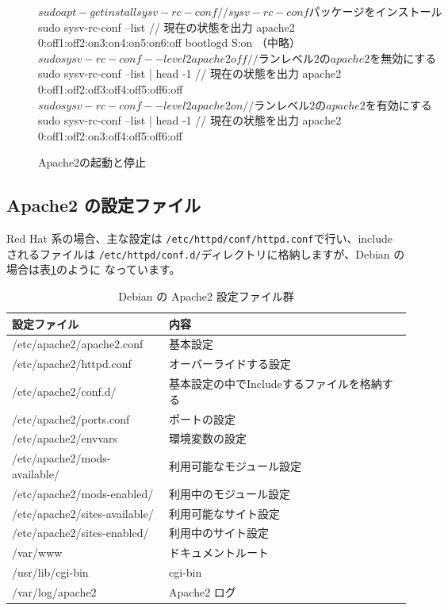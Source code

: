 \documentclass[mingoth,a4paper]{jsarticle}
\begin{document}
\begin{figure}[ht]

\begin{commandline}
$ sudo apt-get install sysv-rc-conf // sysv-rc-conf パッケージをインストール
$ sudo sysv-rc-conf --list // 現在の状態を出力
apache2      0:off1:off2:on3:on4:on5:on6:off
bootlogd     S:on
（中略）
$ sudo sysv-rc-conf --level 2 apache2 off // ランレベル2のapache2を無効にする
$ sudo sysv-rc-conf --list | head -1 // 現在の状態を出力
apache2      0:off1:off2:off3:off4:off5:off6:off
$ sudo sysv-rc-conf --level 2 apache2 on // ランレベル2のapache2を有効にする
$ sudo sysv-rc-conf --list | head -1  // 現在の状態を出力
apache2      0:off1:off2:on3:off4:off5:off6:off
\end{commandline}
\label{fig:sysv-rc}\caption{Apache2の起動と停止}
\end{figure}


\subsection{Apache2 の設定ファイル}

Red Hat 系の場合、主な設定は \texttt{/etc/httpd/conf/httpd.conf}で行い、include されるファイルは
\texttt{/etc/httpd/conf.d/}ディレクトリに格納しますが、Debian の場合は表\ref{tab:apache-files}のように
なっています。

\begin{table}[ht]
\begin{center}
\begin{tabular}{|l|l|}
\hline
設定ファイル & 内容\\
\hline \hline
/etc/apache2/apache2.conf & 基本設定\\
\hline
/etc/apache2/httpd.conf & オーバーライドする設定\\
\hline
/etc/apache2/conf.d/ & 基本設定の中でIncludeするファイルを格納する\\
\hline
/etc/apache2/ports.conf & ポートの設定\\
\hline
/etc/apache2/envvars & 環境変数の設定\\
\hline
/etc/apache2/mods-available/ & 利用可能なモジュール設定\\
\hline
/etc/apache2/mods-enabled/ & 利用中のモジュール設定\\
\hline
/etc/apache2/sites-available/ & 利用可能なサイト設定\\
\hline
/etc/apache2/sites-enabled/ & 利用中のサイト設定\\
\hline
/var/www & ドキュメントルート\\
\hline
/usr/lib/cgi-bin & cgi-bin\\
\hline
/var/log/apache2 & Apache2 ログ\\
\hline
\end{tabular}
\caption{\label{tab:apache-files}{Debian の Apache2 設定ファイル群}}
\end{center}
\end{table}
\end{document}
